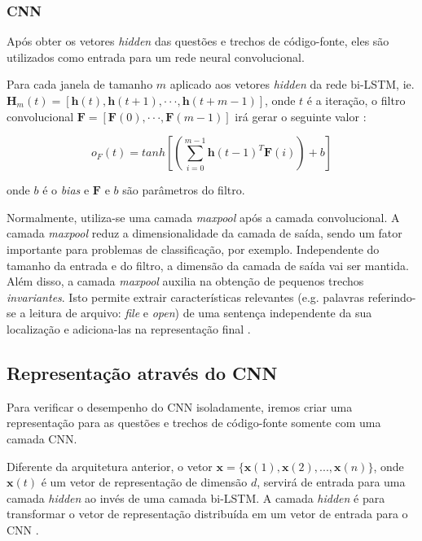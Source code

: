 \subsubsection{CNN}
\label{sec:cnn}

Após obter os vetores \textit{hidden} das questões e trechos de código-fonte, eles são utilizados como entrada para um rede neural convolucional. 

Para cada janela de tamanho $m$ aplicado aos vetores \textit{hidden} da rede bi-LSTM, ie. 
$\bm{H}_{m}(t) = [\bm{h}(t), \bm{h}(t + 1), · · · , \bm{h}(t + m − 1)]$, onde $t$ é a iteração, o filtro convolucional $\bm{F}  = [\bm{F}(0),· · ·, \bm{F}(m − 1)]$ irá gerar o seguinte valor \citep{tan-lstm-qa}:

\begin{equation}
    o_{F}(t) = tanh \left[\left(\sum_{i=0}^{m - 1} \bm{h}(t-1)^{T}\bm{F}(i)\right) + b\right]
\end{equation}

onde $b$ é o \textit{bias} e $\bm{F}$ e $b$ são parâmetros do filtro.

Normalmente, utiliza-se uma camada \textit{maxpool} após a camada convolucional. A camada \textit{maxpool} reduz a dimensionalidade da camada de saída, sendo um fator importante para problemas de classificação, por exemplo. Independente do tamanho da entrada e do filtro, a dimensão da camada de saída vai ser mantida. Além disso, a camada \textit{maxpool} auxilia na obtenção de pequenos trechos \textit{invariantes}. Isto permite extrair características relevantes (e.g. palavras referindo-se a leitura de arquivo: \emph{file} e \emph{open}) de uma sentença independente da sua localização e adiciona-las na representação final \citep{tom-young:trends-deep-learning-nlp}.

\subsection{Representação através do CNN}
\label{sec:representation-cnn}

Para verificar o desempenho do CNN isoladamente, iremos criar uma representação para as questões e trechos de código-fonte somente com uma camada CNN.

Diferente da arquitetura anterior, o vetor $\bm{x} = \{ \bm{x}(1), \bm{x}(2), . . ., \bm{x}(n) \}$, onde $\bm{x}(t)$ é um vetor de representação de dimensão $d$, servirá de entrada para uma camada \textit{hidden} ao invés de uma camada bi-LSTM. A camada \textit{hidden} é para transformar o vetor de representação distribuída em um vetor de entrada para o CNN \citep{tan-lstm-qa}.

